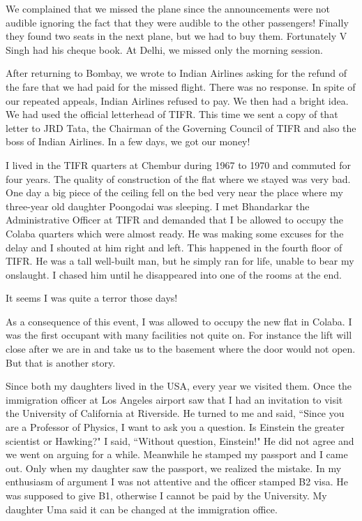We complained that we missed the plane since the announcements were not 
audible ignoring the fact that they were audible to the other 
passengers! Finally they found two seats in the next plane, but we had 
to buy them. Fortunately V Singh had his cheque book. At Delhi, we 
missed only the morning session.
\smallskip

After returning to Bombay, we wrote to Indian Airlines asking for the 
refund of the fare that we had paid for the missed flight. There was no 
response. In spite of our repeated appeals, Indian Airlines refused to 
pay. We then had a bright idea. We had used the official letterhead of 
TIFR. This time we sent a copy of that letter to JRD Tata, the Chairman 
of the Governing Council of TIFR and also the boss of Indian Airlines. 
In a few days, we got our money!
\smallskip

I lived in the TIFR quarters at Chembur during 1967 to 1970 and commuted 
for four years. The quality of construction of the flat where we stayed 
was very bad. One day a big piece of the ceiling fell on the bed very 
near the place where my three-year old daughter Poongodai was sleeping. 
I met Bhandarkar the Administrative Officer at TIFR and demanded that I 
be allowed to occupy the Colaba quarters which were almost ready. He was 
making some excuses for the delay and I shouted at him right and left. 
This happened in the fourth floor of TIFR. He was a tall well-built man, 
but he simply ran for life, unable to bear my onslaught. I chased him 
until he disappeared into one of the rooms at the end.

It seems I was quite a terror those days!
\smallskip

As a consequence of this event, I was allowed to occupy the new flat in 
Colaba. I was the first occupant with many facilities not quite on. For 
instance the lift will close after we are in and take us to the basement 
where the door would not open. But that is another story.
\smallskip

Since both my daughters lived in the USA, every year we visited them. 
Once the immigration officer at Los Angeles airport saw that I had an 
invitation to visit the University of California at Riverside. He turned 
to me and said, ``Since you are a Professor of Physics, I want to ask you 
a question. Is Einstein the greater scientist or Hawking?" I 
said, ``Without question, Einstein!" He did not agree and we went on 
arguing for a while. Meanwhile he stamped my passport and I came out. 
Only when my daughter saw the passport, we realized the mistake. In my 
enthusiasm of argument I was not attentive and the officer stamped B2 
visa. He was supposed to give B1, otherwise I cannot be paid by the 
University. My daughter Uma said it can be changed at the immigration 
office.
\smallskip

